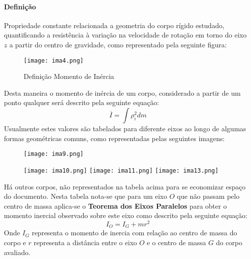 \documentclass{article}
\begin{document}
            \paragraph{Definição}Propriedade constante relacionada a geometria do corpo rígido estudado, quantificando a resistência à variação na velocidade de rotação em torno do eixo $z$ a partir do centro de gravidade, como representado pela seguinte figura:
                \begin{figure}[H]
                    \centering
                    \texttt{[image: ima4.png]}
                    \caption{Definição Momento de Inércia}
                \end{figure}\noindent
            Desta maneira o momento de inércia de um corpo, considerado a partir de um ponto qualquer será descrito pela seguinte equação:
                \begin{equation}
                    \boxed{
                        \overline{I} = \int\rho^{2}_{i}dm
                    }
                \end{equation}
            Usualmente estes valores são tabelados para diferente eixos ao longo de algumas formas geométricas comuns, como representadas pelas seguintes imagens:
                \begin{figure}[H]
                    \centering
                    \texttt{[image: ima9.png]}
                \end{figure}
                \begin{figure}[H]
                    \centering
                    \texttt{[image: ima10.png]}
                    \texttt{[image: ima11.png]}
                    \texttt{[image: ima13.png]}
                \end{figure}\noindent
            Há outros corpos, não representados na tabela acima para se economizar espaço do documento. Nesta tabela nota-se que para um eixo $O$ que não passam pelo centro de massa aplica-se o \textbf{Teorema dos Eixos Paralelos} para obter o momento inercial observado sobre este eixo como descrito pela seguinte equação:
                \begin{equation}
                    \boxed{
                        I_{O} = I_{G} + m r^{2}
                    }
                \end{equation}
            Onde $I_{G}$ representa o momento de inercia com relação ao centro de massa do corpo e $r$ representa a distância entre o eixo $O$ e o centro de massa $G$ do corpo avaliado.
\end{document}
